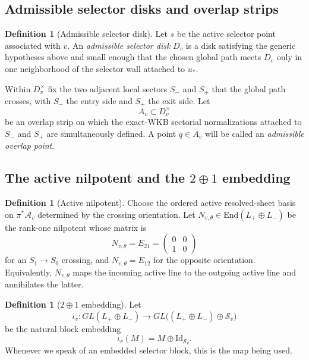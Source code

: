 \documentclass[11pt]{article}
\numberwithin{equation}{section}
\theoremstyle{definition}
\newtheorem{definition}[theorem]{Definition}
\newcommand{\id}{\mathrm{Id}}
\newcommand{\Aact}{\mathcal A_v}
\newcommand{\Ssp}{\mathcal S_v}
\begin{document}
\subsection{Admissible selector disks and overlap strips}

\begin{definition}[Admissible selector disk]
\label{def:selector-disk}
Let $s$ be the active selector point associated with $v$. An \emph{admissible selector disk} $D_v$ is a disk satisfying the generic hypotheses above and small enough that the chosen global path meets $D_v$ only in one neighborhood of the selector wall attached to $u_*$.
\end{definition}

Within $D_v^\times$ fix the two adjacent local sectors $S_-$ and $S_+$ that the global path crosses, with $S_-$ the entry side and $S_+$ the exit side. Let
\begin{equation}
\label{eq:overlap-strip}
A_v\subset D_v^\times
\end{equation}
be an overlap strip on which the exact-WKB sectorial normalizations attached to $S_-$ and $S_+$ are simultaneously defined. A point $q\in A_v$ will be called an \emph{admissible overlap point}.

\subsection{The active nilpotent and the $2\oplus 1$ embedding}

\begin{definition}[Active nilpotent]
\label{def:nilpotent}
Choose the ordered active resolved-sheet basis on $\pi^*\Aact$ determined by the crossing orientation. Let $N_{v,\theta}\in\mathrm{End}(L_+\oplus L_-)$ be the rank-one nilpotent whose matrix is
\begin{equation}
\label{eq:nilpotent-matrix}
N_{v,\theta}=E_{21}=
\begin{pmatrix}
0&0\\
1&0
\end{pmatrix}
\end{equation}
for an $S_1\to S_0$ crossing, and $N_{v,\theta}=E_{12}$ for the opposite orientation. Equivalently, $N_{v,\theta}$ maps the incoming active line to the outgoing active line and annihilates the latter.
\end{definition}

\begin{definition}[$2\oplus 1$ embedding]
\label{def:embedding}
Let
\begin{equation}
\label{eq:iota-def}
\iota_v:GL(L_+\oplus L_-)\longrightarrow GL\bigl((L_+\oplus L_-)\oplus \Ssp\bigr)
\end{equation}
be the natural block embedding
\begin{equation}
\label{eq:iota-formula}
\iota_v(M)=M\oplus \id_{\Ssp}.
\end{equation}
Whenever we speak of an embedded selector block, this is the map being used.
\end{definition}
\end{document}
